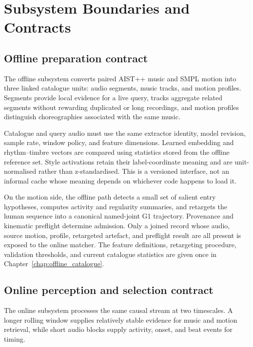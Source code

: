 \section{Subsystem Boundaries and Contracts}
\label{sec:design_subsystem_boundaries}

\subsection{Offline preparation contract}
\label{subsec:design_offline_contract}

The offline subsystem converts paired AIST++ music and SMPL motion
\cite{li2021ai,loper2023smpl} into three linked catalogue units: audio segments,
music tracks, and motion profiles. Segments provide local evidence for a live
query, tracks aggregate related segments without rewarding duplicated or long
recordings, and motion profiles distinguish choreographies associated with the
same music.

Catalogue and query audio must use the same extractor identity, model revision,
sample rate, window policy, and feature dimensions. Learned embedding and
rhythm--timbre vectors are compared using statistics stored from the offline
reference set. Style activations retain their label-coordinate meaning and are
unit-normalised rather than z-standardised. This is a versioned interface, not
an informal cache whose meaning depends on whichever code happens to load it.

On the motion side, the offline path detects a small set of salient entry
hypotheses, computes activity and regularity summaries, and retargets the human
sequence into a canonical named-joint G1 trajectory. Provenance and kinematic
preflight determine admission. Only a joined record whose audio, source motion,
profile, retargeted artefact, and preflight result are all present is exposed to
the online matcher. The feature definitions, retargeting procedure, validation
thresholds, and current catalogue statistics are given once in
Chapter~\ref{chap:offline_catalogue}.

\subsection{Online perception and selection contract}
\label{subsec:design_online_contract}

The online subsystem processes the same causal stream at two timescales. A
longer rolling window supplies relatively stable evidence for music and motion
retrieval, while short audio blocks supply activity, onset, and beat events for
timing.

